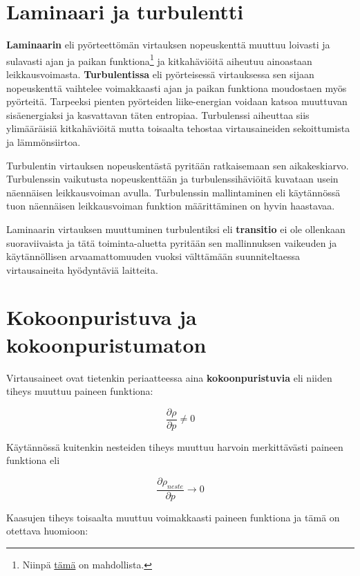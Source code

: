 \documentclass[12pt,a4paper,finnish]{book}
\begin{document}
\section{Laminaari ja turbulentti}
\textbf{Laminaarin} eli pyörteettömän virtauksen nopeuskenttä muuttuu loivasti ja sulavasti ajan 
ja paikan funktiona\footnote{Niinpä 
\href{http://www.newscientist.com/blogs/nstv/2011/08/born-to-be-viral-how-to-unmix-a-mixed-fluid.html}
{tämä} on mahdollista.} ja kitkahäviöitä aiheutuu ainoastaan leikkausvoimasta. \textbf{Turbulentissa} 
eli pyörteisessä virtauksessa sen sijaan nopeuskenttä vaihtelee voimakkaasti ajan ja paikan funktiona 
moudostaen myös pyörteitä. Tarpeeksi pienten pyörteiden liike-energian voidaan katsoa muuttuvan 
sisäenergiaksi ja kasvattavan täten entropiaa. Turbulenssi aiheuttaa siis ylimääräisiä kitkahäviöitä 
mutta toisaalta tehostaa virtausaineiden sekoittumista ja lämmönsiirtoa.

Turbulentin virtauksen nopeuskentästä pyritään ratkaisemaan sen aikakeskiarvo. Turbulenssin 
vaikutusta nopeuskenttään ja turbulenssihäviöitä kuvataan usein näennäisen leikkausvoiman avulla. 
Turbulenssin mallintaminen eli käytännössä tuon näennäisen leikkausvoiman funktion määrittäminen 
on hyvin haastavaa.

Laminaarin virtauksen muuttuminen turbulentiksi eli \textbf{transitio} ei ole ollenkaan suoraviivaista 
ja tätä toiminta-aluetta pyritään sen mallinnuksen vaikeuden ja käytännöllisen arvaamattomuuden vuoksi 
välttämään suunniteltaessa virtausaineita hyödyntäviä laitteita.

\section{Kokoonpuristuva ja kokoonpuristumaton}
Virtausaineet ovat tietenkin periaatteessa aina \textbf{kokoonpuristuvia} eli niiden 
tiheys muuttuu paineen funktiona:

\begin{equation}
 \frac{\partial \rho}{\partial p} \neq 0
\end{equation}

Käytännössä kuitenkin nesteiden tiheys muuttuu harvoin merkittävästi paineen funktiona eli

\begin{equation}
 \frac{\partial \rho_{neste}}{\partial p} \rightarrow 0
\end{equation}

Kaasujen tiheys toisaalta muuttuu voimakkaasti paineen funktiona ja tämä on otettava huomioon:
\end{document}
